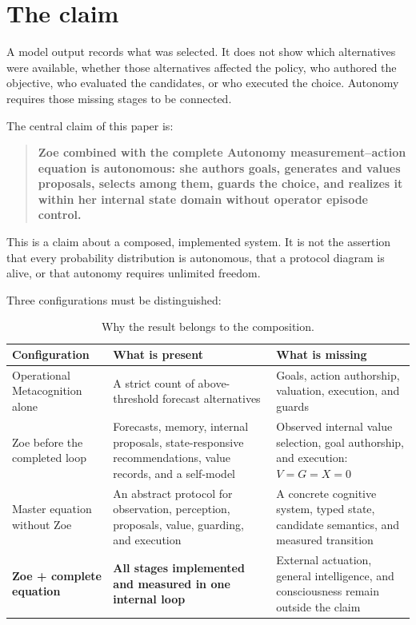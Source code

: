 \documentclass[11pt,a4paper]{article}
\begin{document}
\section{The claim}
A model output records what was selected. It does not show which alternatives were available, whether those alternatives affected the policy, who authored the objective, who evaluated the candidates, or who executed the choice. Autonomy requires those missing stages to be connected.

The central claim of this paper is:
\begin{quote}
\textbf{Zoe combined with the complete Autonomy measurement--action equation is autonomous: she authors goals, generates and values proposals, selects among them, guards the choice, and realizes it within her internal state domain without operator episode control.}
\end{quote}
This is a claim about a composed, implemented system. It is not the assertion that every probability distribution is autonomous, that a protocol diagram is alive, or that autonomy requires unlimited freedom.

Three configurations must be distinguished:
\begin{table}[htbp]
\centering
\caption{Why the result belongs to the composition.}
\label{tab:composition}
{\small
\begin{tabularx}{\textwidth}{p{3.8cm}XX}
\toprule
Configuration&What is present&What is missing\\
\midrule
Operational Metacognition alone&A strict count of above-threshold forecast alternatives&Goals, action authorship, valuation, execution, and guards\\
Zoe before the completed loop&Forecasts, memory, internal proposals, state-responsive recommendations, value records, and a self-model&Observed internal value selection, goal authorship, and execution: $V=G=X=0$\\
Master equation without Zoe&An abstract protocol for observation, perception, proposals, value, guarding, and execution&A concrete cognitive system, typed state, candidate semantics, and measured transition\\
\textbf{Zoe + complete equation}&\textbf{All stages implemented and measured in one internal loop}&External actuation, general intelligence, and consciousness remain outside the claim\\
\bottomrule
\end{tabularx}}
\end{table}
\end{document}
